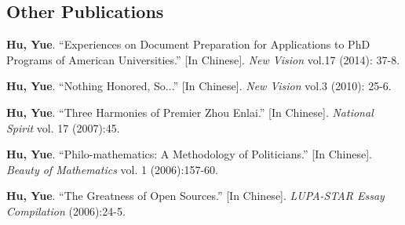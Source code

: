 \documentclass[a4paper,10pt]{article} %
\renewenvironment{itemize}{
	\begin{list}{}{
			\setlength{\leftmargin}{1.5em}
		}
	}{
\end{list}
}
\begin{document}
	\subsection*{Other Publications}
	\begin{itemize} 
		\item \textbf{Hu, Yue}. ``Experiences on Document Preparation for Applications to PhD Programs of American Universities.'' [In Chinese]. \textit{New Vision} vol.17 (2014): 37-8.
		\item \textbf{Hu, Yue}. ``Nothing Honored, So...'' [In Chinese]. \textit{New Vision} vol.3 (2010): 25-6.
		\item \textbf{Hu, Yue}. ``Three Harmonies of Premier Zhou Enlai.'' [In Chinese]. \textit{National Spirit} vol. 17 (2007):45.
		\item \textbf{Hu, Yue}. ``Philo-mathematics: A Methodology of Politicians.'' [In Chinese]. \textit{Beauty of Mathematics} vol. 1 (2006):157-60.
		\item \textbf{Hu, Yue}. ``The Greatness of Open Sources.'' [In Chinese]. \textit{LUPA-STAR Essay Compilation} (2006):24-5.
	\end{itemize}
\end{document}
